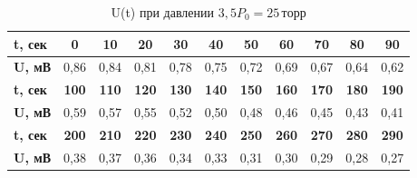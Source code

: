 \documentclass[a4paper, fontsize = 14pt]{article}
\begin{document}
\begin{table}[h]
\centering
\caption{U(t) при давлении $3,5P_0=25 \, торр$}
\begin{tabular}{|l|c|c|c|c|c|c|c|c|c|c|}
\hline
\textbf{t, сек} & \textbf{0}   & \textbf{10}  & \textbf{20}  & \textbf{30}  & \textbf{40}  & \textbf{50}  & \textbf{60}  & \textbf{70}  & \textbf{80}  & \textbf{90}  \\ \hline
\textbf{U, мВ}  & 0,86         & 0,84         & 0,81         & 0,78         & 0,75         & 0,72         & 0,69         & 0,67         & 0,64         & 0,62         \\ \hline
\textbf{t, сек} & \textbf{100} & \textbf{110} & \textbf{120} & \textbf{130} & \textbf{140} & \textbf{150} & \textbf{160} & \textbf{170} & \textbf{180} & \textbf{190} \\ \hline
\textbf{U, мВ}  & 0,59         & 0,57         & 0,55         & 0,52         & 0,50         & 0,48         & 0,46         & 0,45         & 0,43         & 0,41         \\ \hline
\textbf{t, сек} & \textbf{200} & \textbf{210} & \textbf{220} & \textbf{230} & \textbf{240} & \textbf{250} & \textbf{260} & \textbf{270} & \textbf{280} & \textbf{290} \\ \hline
\textbf{U, мВ}  & 0,38         & 0,37         & 0,36         & 0,34         & 0,33         & 0,31         & 0,30         & 0,29         & 0,28         & 0,27         \\ \hline
\end{tabular}
\end{table}
\end{document}
